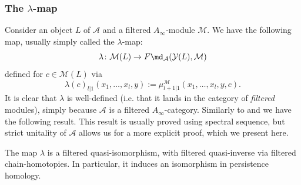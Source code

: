 

\subsubsection{The $\lambda$-map}\label{lambdamap}
Consider an object $L$ of $\mathcal{A}$ and a filtered $A_\infty$-module $\mathcal{M}$. We have the following map, usually simply called the $\lambda$-map: $$\lambda\colon \mathcal{M}(L)\to F\md_\mathcal{A}(\mathcal{Y}(L),\mathcal{M})$$ defined for $c\in \mathcal{M}(L)$ via $$\lambda(c)_{l|1}(x_1,\ldots, x_l,y):= \mu^\mathcal{M}_{l+1|1}(x_1,\ldots, x_l,y,c).$$ It is clear that $\lambda$ is well-defined (i.e. that it lands in the category of \textit{filtered} modules), simply because $\mathcal{A}$ is a filtered $A_\infty$-category. Similarly to \cite[Lemma 2.12]{Se:book-fukaya-categ} and \cite[Proposition 2.5.1]{Bi-Co-Sh:LagrSh} we have the following result. This result is usually proved using spectral sequence, but strict unitality of $\mathcal{A}$ allows us for a more explicit proof, which we present here.
\begin{prop}
	The map $\lambda$ is a filtered quasi-isomorphism, with filtered quasi-inverse via filtered chain-homotopies. In particular, it induces an isomorphism in persistence homology.
\end{prop}
